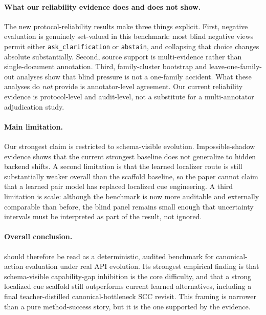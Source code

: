\paragraph{What our reliability evidence does and does not show.}
The new protocol-reliability results make three things explicit. First, negative evaluation is genuinely set-valued in this benchmark: most blind negative views permit either \texttt{ask\_clarification} or \texttt{abstain}, and collapsing that choice changes absolute \NOS{} substantially. Second, source support is multi-evidence rather than single-document annotation. Third, family-cluster bootstrap and leave-one-family-out analyses show that blind pressure is not a one-family accident. What these analyses do \emph{not} provide is annotator-level agreement. Our current reliability evidence is protocol-level and audit-level, not a substitute for a multi-annotator adjudication study.

\paragraph{Main limitation.}
Our strongest claim is restricted to schema-visible evolution. Impossible-shadow evidence shows that the current strongest baseline does not generalize to hidden backend shifts. A second limitation is that the learned localizer route is still substantially weaker overall than the scaffold baseline, so the paper cannot claim that a learned pair model has replaced localized cue engineering. A third limitation is scale: although the benchmark is now more auditable and externally comparable than before, the blind panel remains small enough that uncertainty intervals must be interpreted as part of the result, not ignored.

\paragraph{Overall conclusion.}
\toolshift{} should therefore be read as a deterministic, audited benchmark for canonical-action evaluation under real API evolution. Its strongest empirical finding is that schema-visible capability-gap inhibition is the core difficulty, and that a strong localized cue scaffold still outperforms current learned alternatives, including a final teacher-distilled canonical-bottleneck SCC revisit. This framing is narrower than a pure method-success story, but it is the one supported by the evidence.
